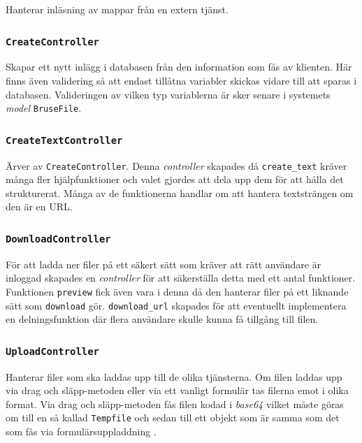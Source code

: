 Hanterar inläsning av mappar från en extern tjänst.

\subsubsection{\texttt{CreateController}}

Skapar ett nytt inlägg i databasen från den information som fås av klienten.
Här finns även validering så att endast tillåtna variabler skickas vidare till
att sparas i databasen. Valideringen av vilken typ variablerna är sker senare i
systemets \emph{model} \texttt{BruseFile}.

\subsubsection{\texttt{CreateTextController}}

Ärver av \texttt{CreateController}. Denna \emph{controller} skapades då
\texttt{create\_text} kräver många fler hjälpfunktioner och valet gjordes att
dela upp dem för att hålla det strukturerat. Många av de funktionerna handlar
om att hantera textsträngen om den är en URL.

\subsubsection{\texttt{DownloadController}}

För att ladda ner filer på ett säkert sätt som kräver att rätt användare är
inloggad skapades en \emph{controller} för att säkerställa detta med ett antal
funktioner. Funktionen \texttt{preview} fick även vara i denna då den hanterar
filer på ett liknande sätt som \texttt{download} gör. \texttt{download\_url}
skapades för att eventuellt implementera en delningsfunktion där flera
användare skulle kunna få tillgång till filen.

\subsubsection{\texttt{UploadController}}

Hanterar filer som ska laddas upp till de olika tjänsterna. Om filen laddas upp
via drag och släpp-metoden eller via ett vanligt formulär tas filerna emot i
olika format. Via drag och släpp-metoden fås filen kodad i \emph{base64}
vilket måste göras om till en så kallad \texttt{Tempfile} och sedan till ett
objekt som är samma som det som fås via formulärsuppladdning \cite{base64}.

